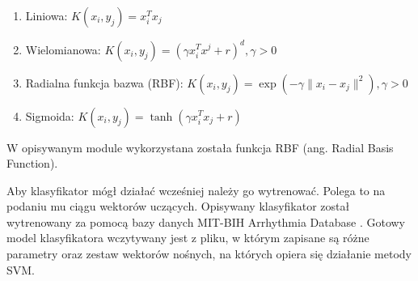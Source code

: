\begin{enumerate}
	\item Liniowa: $K\left(x_i,y_j\right)=x_i^Tx_j$
	\item Wielomianowa: $K\left(x_i,y_j\right)=\left(\gamma x_i^Tx^j+r\right)^d, \gamma > 0$
	\item Radialna funkcja bazwa (RBF): $K\left(x_i,y_j\right)=\exp{\left(-\gamma \|x_i-x_j\|^2\right)}, \gamma > 0$
	\item Sigmoida: $K\left(x_i,y_j\right)=\tanh{\left(\gamma x_i^Tx_j+r\right)}$
\end{enumerate}

W opisywanym module wykorzystana została funkcja RBF (ang. Radial Basis Function).

Aby klasyfikator mógł działać wcześniej należy go wytrenować. Polega to na podaniu mu ciągu wektorów uczących. Opisywany klasyfikator został wytrenowany za pomocą bazy danych MIT-BIH Arrhythmia Database \cite{MITDB}. Gotowy model klasyfikatora wczytywany jest z pliku, w którym zapisane są różne parametry oraz zestaw wektorów nośnych, na których opiera się działanie metody SVM.
